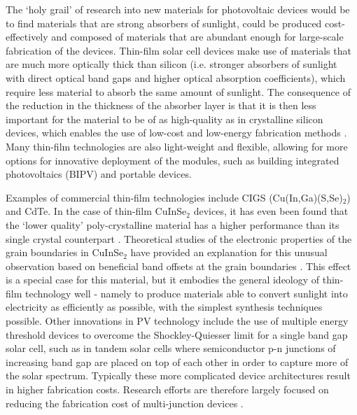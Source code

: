 \documentclass[11pt, twoside]{report}
\begin{document}
The `holy grail' of research into new materials for photovoltaic devices would be to find materials that are strong absorbers of sunlight, could be produced cost-effectively and composed of materials that are abundant enough for large-scale fabrication of the devices. 
Thin-film solar cell devices make use of materials that are much more optically thick than silicon (i.e. stronger absorbers of sunlight with direct optical band gaps and higher optical absorption coefficients), which require less material to absorb the same amount of sunlight. %
The consequence of the reduction in the thickness of the absorber layer is that it is then less important for the material to be of as high-quality as in crystalline silicon devices, which enables the use of low-cost and low-energy fabrication methods \cite{emerging_pv}. Many thin-film technologies are also light-weight and flexible, allowing for more options for innovative deployment of the modules, such as building integrated photovoltaics (BIPV) and portable devices.

Examples of commercial thin-film technologies include CIGS (Cu(In,Ga)(S,Se)$_2$) and CdTe. 
In the case of thin-film CuInSe$_2$ devices, it has even been found that the `lower quality' poly-crystalline material has a higher performance than its single crystal counterpart \cite{CIS1_3, CIS1_4}. Theoretical studies of the electronic properties of the grain boundaries in CuInSe$_2$ have provided an explanation for this unusual observation based on beneficial band offsets at the grain boundaries \cite{CIS1, CIS2}. This effect is a special case for this material, but it embodies the general ideology of thin-film technology well - namely to produce materials able to convert sunlight into electricity as efficiently as possible, with the simplest synthesis techniques possible.
Other innovations in PV technology include the use of multiple energy threshold devices to overcome the Shockley-Quiesser limit \cite{SQ_1961} for a single band gap solar cell, such as in tandem solar cells where semiconductor p-n junctions of increasing band gap are placed on top of each other in order to capture more of the solar spectrum. Typically these more complicated device architectures result in higher fabrication costs. Research efforts are therefore largely focused on reducing the fabrication cost of multi-junction devices \cite{3rd_gen}.
\end{document}
